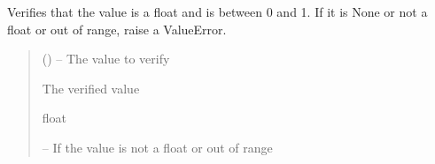 \documentclass[letterpaper,10pt,english]{sphinxmanual}
\begin{document}

\begin{fulllineitems}
\label{\detokenize{fspsim.utils:fspsim.utils.SpaceObject.verify_eccentricity}}
\pysigstartsignatures
{}
\pysigstopsignatures
\sphinxAtStartPar
Verifies that the value is a float and is between 0 and 1. If it is None or not a
float or out of range, raise a ValueError.
\begin{quote}\begin{description}
\sphinxAtStartPar
{} () – The value to verify

\sphinxAtStartPar
The verified value

\sphinxAtStartPar
float

\sphinxAtStartPar
{} – If the value is not a float or out of range

\end{description}\end{quote}

\end{fulllineitems}

\end{document}
